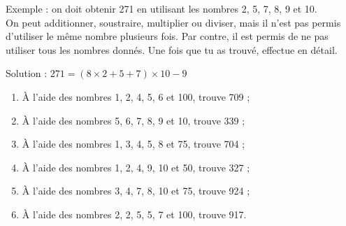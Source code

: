\begin{exercice}
Exemple : on doit obtenir 271 en utilisant les nombres 2, 5, 7, 8, 9 et 10. \\[0.75em]
On peut additionner, soustraire, multiplier ou diviser, mais il n’est pas permis d’utiliser le même nombre plusieurs fois. Par contre, il est permis de ne pas utiliser tous les nombres donnés. Une fois que tu as trouvé, effectue en détail.
\begin{center} Solution : $271 = (8 \times 2 + 5 + 7) \times 10 - 9$ \end{center}
\begin{enumerate}
 \item À l'aide des nombres 1, 2, 4, 5, 6 et 100, trouve 709 ;
 \item À l'aide des nombres 5, 6, 7, 8, 9 et 10, trouve 339 ;
 \item À l'aide des nombres 1, 3, 4, 5, 8 et 75, trouve 704 ;
 \item À l'aide des nombres 1, 2, 4, 9, 10 et 50, trouve 327 ;
 \item À l'aide des nombres 3, 4, 7, 8, 10 et 75, trouve 924 ;
 \item À l'aide des nombres 2, 2, 5, 5, 7 et 100, trouve 917.
 \end{enumerate}
\end{exercice}
